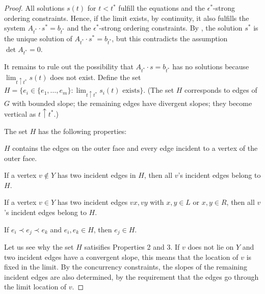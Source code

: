 \documentclass{patmorin}
\begin{document}
\begin{proof}
All solutions $s(t)$ for $t<t^*$ fulfill the equations and
the $\epsilon^*$-strong ordering constraints.
Hence, if the limit exists, by continuity, it also fulfills
the system $A_{t^*}\cdot s^*=b_{t^*}$
and the $\epsilon^*$-strong ordering constraints.
 By , the solution $s^*$ is
the unique solution
of $A_{t^*}\cdot s^*=b_{t^*}$, but this contradicts the assumption
$\det A_{t^*}= 0$.

 It remains to rule out the possibility that
 $A_{t^*}\cdot s=b_{t^*}$ has no solutions because
   $\lim_{t\uparrow t^*} s(t)$ does not exist.  Define the set $H=\{e_i\in
   \{e_1,\ldots,e_m\}:\text{$\lim_{t\uparrow t^*} s_i(t)$ exists}\}$.
(The set $H$ corresponds to edges of $G$
   with
   bounded slope; the remaining edges have divergent slopes; they
   become vertical as $t\uparrow t^*$.)
   \begin{prop}
The set   $H$ has the following
   properties:
   \begin{compactenum}
    \item $H$ contains the edges
      on the outer face and every edge incident to a vertex of the outer face.
    \item \label{off-C}
If a vertex $v\not\in Y$ has two incident edges in
$H$,
then all $v$'s incident edges belong to $H$.
    \item \label{on-C}
If a vertex $v\in Y$ has two incident edges $vx,vy$ with $x,y\in L$ or $x,y\in R$, then all $v$'s incident edges belong to $H$.
    \item If $e_i \prec e_j \prec e_k$ and $e_i,e_k\in H$, 
      then $e_j\in H$.
   \end{compactenum}
   \end{prop}
Let us see why the set $H$ satisifies Properties 2 and 3.
If $v$ does not lie on $Y$ and two incident edges have a convergent
slope, this means that the location of $v$ is fixed in the limit.
By the concurrency constraints, the slopes of the remaining incident
edges are also determined, by the requirement that the edges go through
the limit location of $v$.


\end{proof}
\end{document}
